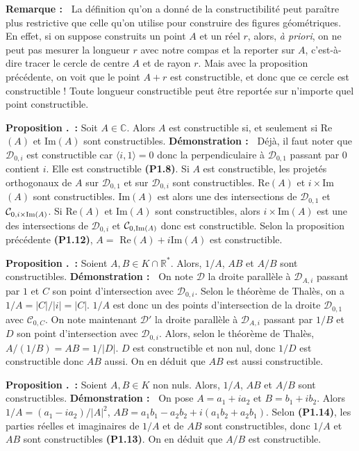 \documentclass[5pt,a4paper]{article}
\newcounter{prop}[section]
\renewcommand{\theprop}{\thesection.\arabic{prop}}
\newcommand{\prop}[1]{\stepcounter{prop}\noindent\textbf{Proposition \theprop ~:} #1 \newline}
\newcommand{\demo}[1]{\textbf{Démonstration :~} #1 \newline}
\newcommand{\rmq}[1]{\textbf{Remarque :~} #1 \newline}
\begin{document}
\begin{onehalfspacing}
\rmq{La définition qu'on a donné de la constructibilité peut paraître plus restrictive que celle qu'on utilise pour construire des figures géométriques. En effet, si on suppose construits un point $A$ et un réel $r$, alors, \textit{à priori}, on ne peut pas mesurer la longueur $r$ avec notre compas et la reporter sur $A$, c'est-à-dire tracer le cercle de centre $A$ et de rayon $r$. Mais avec la proposition précédente, on voit que le point $A + r$ est constructible, et donc que ce cercle est constructible ! Toute longueur constructible peut être reportée sur n'importe quel point constructible.}

\prop{Soit $A \in \mathbb{C}$. Alors $A$ est constructible si, et seulement si Re$(A)$ et Im$(A)$ sont constructibles.}
\demo{Déjà, il faut noter que $\mathcal{D}_{0, i}$ est constructible car $\langle i, 1 \rangle = 0$ donc la perpendiculaire à $\mathcal{D}_{0, 1}$ passant par 0 contient $i$. Elle est constructible \textbf{(P1.8)}. Si $A$ est constructible, les projetés orthogonaux de $A$ sur $\mathcal{D}_{0, 1}$ et sur $\mathcal{D}_{0, i}$ sont constructibles. Re$(A)$ et $i \times $Im$(A)$ sont constructibles. Im$(A)$ est alors une des intersections de $\mathcal{D}_{0, 1}$ et $\mathcal{C}_{0, i\times\textup{Im}(A)}$. Si Re$(A)$ et Im$(A)$ sont constructibles, alors $i \times$Im$(A)$ est une des intersections de $\mathcal{D}_{0, i}$ et $\mathcal{C}_{0, \textup{Im}(A)}$ donc est constructible. Selon la proposition précédente \textbf{(P1.12)}, $A = $ Re$(A) + i$Im$(A)$ est constructible.}


\prop{Soient $A, B \in K \cap \mathbb{R}^*$. Alors, $1/A$, $AB$ et $A/B$ sont constructibles.}
\demo{On note $\mathcal{D}$ la droite parallèle à $\mathcal{D}_{A, i}$ passant par $1$ et $C$ son point d'intersection avec $\mathcal{D}_{0, i}$. Selon le théorème de Thalès, on a $1/A = |C|/|i| = |C|$. $1/A$ est donc un des points d'intersection de la droite $\mathcal{D}_{0, 1}$ avec $\mathcal{C}_{0, C}$. On note maintenant $\mathcal{D}'$ la droite parallèle à $\mathcal{D}_{A, i}$ passant par $1/B$ et $D$ son point d'intersection avec $\mathcal{D}_{0, i}$. Alors, selon le théorème de Thalès, $A/(1/B) = AB = 1/|D|$. $D$ est constructible et non nul, donc $1/D$ est constructible donc $AB$ aussi. On en déduit que $AB$ est aussi constructible.}


\prop{Soient $A, B \in K$ non nuls. Alors, $1/A$, $AB$ et $A/B$ sont constructibles.}
\demo{On pose $A = a_1 + ia_2$ et $B = b_1 + ib_2$. Alors $1/A = (a_1 - ia_2)/|A|^2$, $AB = a_1b_1 - a_2b_2 + i(a_1b_2 + a_2b_1)$. Selon \textbf{(P1.14)}, les parties réelles et imaginaires de $1/A$ et de $AB$ sont constructibles, donc $1/A$ et $AB$ sont constructibles \textbf{(P1.13)}. On en déduit que $A/B$ est constructible.}


\end{onehalfspacing}
\end{document}
